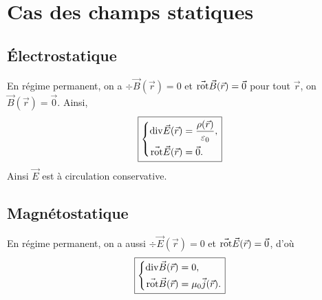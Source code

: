 \section{Cas des champs statiques}
\subsection{Électrostatique}

En régime permanent, on a $\div\vec{B}(\vec{r})=0$ et $\vec{\mathrm{rot}}\vec{B}(\vec{r})=\vec{0}$ pour tout $\vec{r}$, on $\vec{B}(\vec{r})=\vec{0}$. Ainsi,
\begin{equation}
    \boxed{
        \left\lbrace
        \begin{aligned}
            \mathrm{div}\vec{E}(\vec{r})&=\frac{\rho(\vec{r})}{\varepsilon_0},\\
            \vec{\mathrm{rot}}\vec{E}(\vec{r})&=\vec{0}.
        \end{aligned}
        \right.
    }
\end{equation}
Ainsi $\vec{E}$ est à circulation conservative.

\subsection{Magnétostatique}

En régime permanent, on a aussi $\div\vec{E}(\vec{r})=0$ et $\vec{\mathrm{rot}}\vec{E}(\vec{r})=\vec{0}$, d'où
\begin{equation}
    \boxed{
        \left\lbrace
        \begin{aligned}
            \mathrm{div}\vec{B}(\vec{r})&=0,\\
            \vec{\mathrm{rot}}\vec{B}(\vec{r})&=\mu_0\vec{j}(\vec{r}).
        \end{aligned}
        \right.
    }
\end{equation}